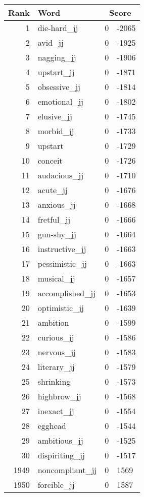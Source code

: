 \begin{longtable}[!htbp]{| rlr@{.}l |}
    \hline
    \textbf{Rank} & \textbf{Word} & \multicolumn{2}{c|}{\textbf{Score}} \\
    \hline
    \endhead
    1 & die-hard\_jj & 0 & -2065 \\
    2 & avid\_jj & 0 & -1925 \\
    3 & nagging\_jj & 0 & -1906 \\
    4 & upstart\_jj & 0 & -1871 \\
    5 & obsessive\_jj & 0 & -1814 \\
    6 & emotional\_jj & 0 & -1802 \\
    7 & elusive\_jj & 0 & -1745 \\
    8 & morbid\_jj & 0 & -1733 \\
    9 & upstart & 0 & -1729 \\
    10 & conceit & 0 & -1726 \\
    11 & audacious\_jj & 0 & -1710 \\
    12 & acute\_jj & 0 & -1676 \\
    13 & anxious\_jj & 0 & -1668 \\
    14 & fretful\_jj & 0 & -1666 \\
    15 & gun-shy\_jj & 0 & -1664 \\
    16 & instructive\_jj & 0 & -1663 \\
    17 & pessimistic\_jj & 0 & -1663 \\
    18 & musical\_jj & 0 & -1657 \\
    19 & accomplished\_jj & 0 & -1653 \\
    20 & optimistic\_jj & 0 & -1639 \\
    21 & ambition & 0 & -1599 \\
    22 & curious\_jj & 0 & -1586 \\
    23 & nervous\_jj & 0 & -1583 \\
    24 & literary\_jj & 0 & -1579 \\
    25 & shrinking & 0 & -1573 \\
    26 & highbrow\_jj & 0 & -1568 \\
    27 & inexact\_jj & 0 & -1554 \\
    28 & egghead & 0 & -1544 \\
    29 & ambitious\_jj & 0 & -1525 \\
    30 & dispiriting\_jj & 0 & -1517 \\
    1949 & noncompliant\_jj & 0 & 1569 \\
    1950 & forcible\_jj & 0 & 1587 \\

\end{longtable}
